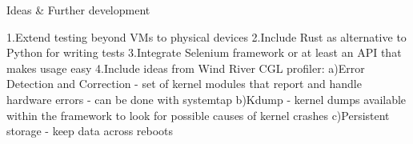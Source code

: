 \documentclass{article}
\begin{document}
	Ideas & Further development

	1.Extend testing beyond VMs to physical devices
	2.Include Rust as alternative to Python for writing tests
	3.Integrate Selenium framework or at least an API that makes usage easy
	4.Include ideas from Wind River CGL profiler:
	a)Error Detection and Correction - set of kernel modules that report and handle hardware errors - can be done with systemtap
	b)Kdump - kernel dumps available within the framework to look for possible causes of kernel crashes
	c)Persistent storage - keep data across reboots
\end{document}
